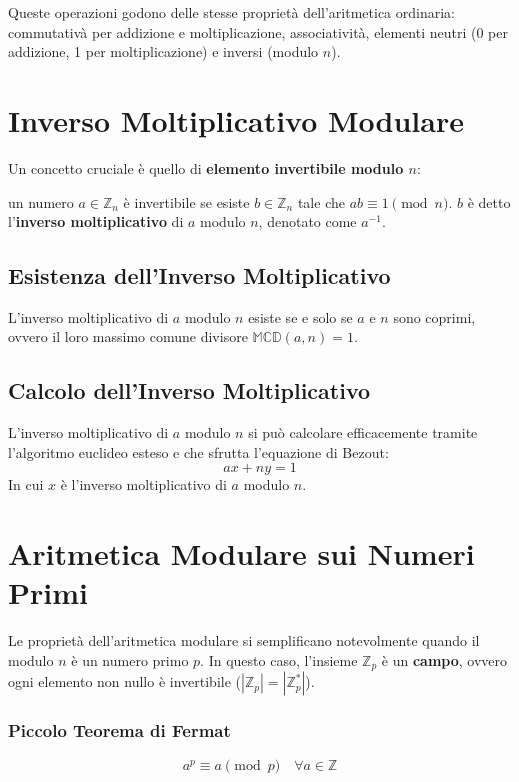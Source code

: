 \documentclass[a4paper,12pt]{report}
\begin{document}
Queste operazioni godono delle stesse proprietà dell'aritmetica ordinaria: commutativà per addizione e moltiplicazione, associatività, elementi neutri (0 per addizione, 1 per moltiplicazione) e inversi (modulo $n$).

\section{Inverso Moltiplicativo Modulare}

Un concetto cruciale è quello di \textbf{elemento invertibile modulo $n$}: 

un numero $a \in \mathbb{Z}_n$ è invertibile se esiste $b \in \mathbb{Z}_n$ tale che $ab \equiv 1 \pmod{n}$. $b$ è detto l'\textbf{inverso moltiplicativo} di $a$ modulo $n$, denotato come $a^{-1}$.

\subsection*{Esistenza dell'Inverso Moltiplicativo}
L'inverso moltiplicativo di $a$ modulo $n$ esiste se e solo se $a$ e $n$ sono coprimi, ovvero il loro massimo comune divisore $\mathbb{MCD}(a,n) = 1$. 

\subsection*{Calcolo dell'Inverso Moltiplicativo} \label{sec:inverso}
L'inverso moltiplicativo di $a$ modulo $n$ si può calcolare efficacemente tramite l'algoritmo euclideo esteso e che sfrutta l'equazione di Bezout:
\[ ax+ny=1 \]
In cui $x$ è l'inverso moltiplicativo di $a$ modulo $n$.

\section{Aritmetica Modulare sui Numeri Primi}

Le proprietà dell'aritmetica modulare si semplificano notevolmente quando il modulo $n$ è un numero primo $p$. In questo caso, l'insieme $\mathbb{Z}_p$ è un \textbf{campo}, ovvero ogni elemento non nullo è invertibile (\( |\mathbb{Z}_p| =|\mathbb{Z}_p^*| \)).

\subsubsection*{Piccolo Teorema di Fermat}

$$a^p \equiv a \pmod{p} \quad \forall a \in \mathbb{Z}$$
\end{document}
